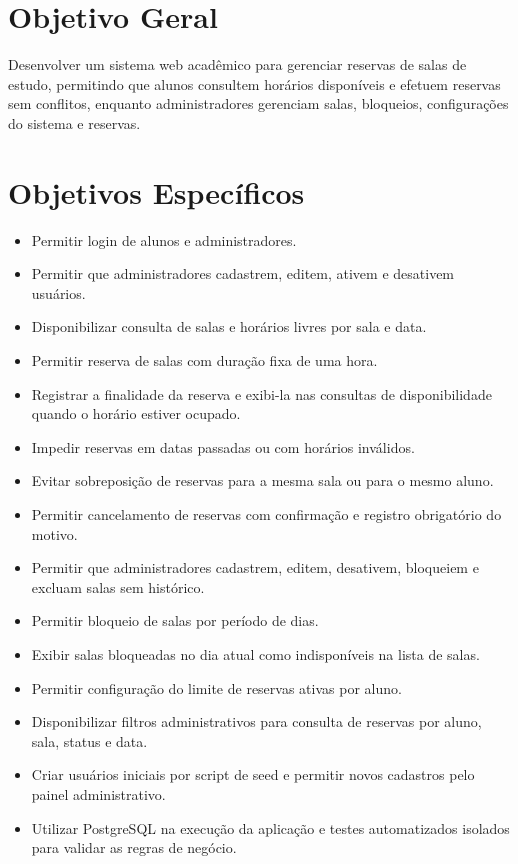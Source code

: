 \documentclass[12pt,a4paper]{article}
\begin{document}
\section{Objetivo Geral}

Desenvolver um sistema web acadêmico para gerenciar reservas de salas de estudo, permitindo que alunos consultem horários disponíveis e efetuem reservas sem conflitos, enquanto administradores gerenciam salas, bloqueios, configurações do sistema e reservas.

\section{Objetivos Específicos}

\begin{itemize}
    \item Permitir login de alunos e administradores.
    \item Permitir que administradores cadastrem, editem, ativem e desativem usuários.
    \item Disponibilizar consulta de salas e horários livres por sala e data.
    \item Permitir reserva de salas com duração fixa de uma hora.
    \item Registrar a finalidade da reserva e exibi-la nas consultas de disponibilidade quando o horário estiver ocupado.
    \item Impedir reservas em datas passadas ou com horários inválidos.
    \item Evitar sobreposição de reservas para a mesma sala ou para o mesmo aluno.
    \item Permitir cancelamento de reservas com confirmação e registro obrigatório do motivo.
    \item Permitir que administradores cadastrem, editem, desativem, bloqueiem e excluam salas sem histórico.
    \item Permitir bloqueio de salas por período de dias.
    \item Exibir salas bloqueadas no dia atual como indisponíveis na lista de salas.
    \item Permitir configuração do limite de reservas ativas por aluno.
    \item Disponibilizar filtros administrativos para consulta de reservas por aluno, sala, status e data.
    \item Criar usuários iniciais por script de seed e permitir novos cadastros pelo painel administrativo.
    \item Utilizar PostgreSQL na execução da aplicação e testes automatizados isolados para validar as regras de negócio.
\end{itemize}
\end{document}
